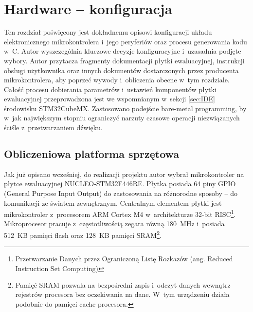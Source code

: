 \chapter{Hardware -- konfiguracja}
Ten rozdział poświęcony jest dokładnemu opisowi konfiguracji układu elektronicznego mikrokontrolera i~jego peryferiów oraz procesu generowania kodu w~C. Autor wyszczególnia kluczowe decyzje konfiguracyjne i~uzasadnia podjęte wybory. Autor przytacza fragmenty dokumentacji płytki ewaluacyjnej, instrukcji obsługi użytkownika oraz innych dokumentów dostarczonych przez producenta mikrokontrolera, aby poprzeć wywody i~obliczenia obecne w~tym rozdziale. Całość procesu dobierania parametrów i~ustawień komponentów płytki ewaluacyjnej przeprowadzona jest we wspomnianym w~sekcji \ref{sec:IDE} środowisku STM32CubeMX. Zastosowano podejście bare-metal programming, by w~jak największym stopniu ograniczyć narzuty czasowe operacji niezwiązanych ściśle z~przetwarzaniem dźwięku.
\section{Obliczeniowa platforma sprzętowa}
Jak już opisano wcześniej, do realizacji projektu autor wybrał mikrokontroler na płytce ewaluacyjnej NUCLEO-STM32F446RE. Płytka posiada 64 piny GPIO (General Purpose Input Output) do zastosowania na różnorodne sposoby -- do komunikacji ze światem zewnętrznym. Centralnym elementem płytki jest mikrokontroler z~procesorem ARM Cortex M4 w~architekturze 32-bit RISC\footnote{Przetwarzanie Danych przez Ograniczoną Listę Rozkazów (ang. Reduced Instruction Set Computing)}. Mikroprocesor pracuje z~częstotliwością zegara równą \SI{180}{\MHz} i~posiada 512~KB pamięci flash oraz 128~KB pamięci SRAM\footnote{Pamięć SRAM pozwala na bezpośredni zapis i~odczyt danych wewnątrz rejestrów procesora bez oczekiwania na dane. W~tym urządzeniu działa podobnie do pamięci cache procesora.}.
